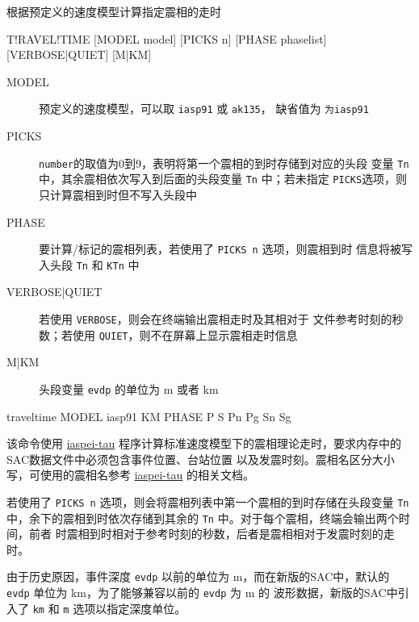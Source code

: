 \label{cmd:traveltime}

根据预定义的速度模型计算指定震相的走时

\begin{SACSTX}
T!RAVEL!TIME [MODEL model] [PICKS n] [PHASE phaselist]
    [VERBOSE|QUIET] [M|KM]
\end{SACSTX}

\begin{description}
\item [MODEL] 预定义的速度模型，可以取 \texttt{iasp91} 或 \texttt{ak135}，
    缺省值为 \texttt{为iasp91}
\item [PICKS] \texttt{number}的取值为0到9，表明将第一个震相的到时存储到对应的头段
    变量 \texttt{Tn} 中，其余震相依次写入到后面的头段变量 \texttt{Tn} 中；若未指定
    \texttt{PICKS}选项，则只计算震相到时但不写入头段中
\item [PHASE] 要计算/标记的震相列表，若使用了 \texttt{PICKS n} 选项，则震相到时
    信息将被写入头段 \texttt{Tn} 和 \texttt{KTn} 中
\item [VERBOSE|QUIET] 若使用 \texttt{VERBOSE}，则会在终端输出震相走时及其相对于
    文件参考时刻的秒数；若使用 \texttt{QUIET}，则不在屏幕上显示震相走时信息
\item [M|KM] 头段变量 \texttt{evdp} 的单位为 \si{\m} 或者 \si{\km}
\end{description}

\begin{SACDFT}
traveltime MODEL iasp91 KM PHASE P S Pn Pg Sn Sg
\end{SACDFT}

该命令使用 \href{https://seiscode.iris.washington.edu/projects/iaspei-tau}{iaspei-tau}
程序计算标准速度模型下的震相理论走时，要求内存中的SAC数据文件中必须包含事件位置、台站位置
以及发震时刻。震相名区分大小写，可使用的震相名参考 
\href{https://seiscode.iris.washington.edu/projects/iaspei-tau}{iaspei-tau} 
的相关文档。

若使用了 \texttt{PICKS n} 选项，则会将震相列表中第一个震相的到时存储在头段变量 \texttt{Tn}
中，余下的震相到时依次存储到其余的 \texttt{Tn} 中。对于每个震相，终端会输出两个时间，前者
时震相到时相对于参考时刻的秒数，后者是震相相对于发震时刻的走时。

由于历史原因，事件深度 \texttt{evdp} 以前的单位为 \si{\m}，而在新版的SAC中，默认的
\texttt{evdp} 单位为 \si{\km}，为了能够兼容以前的 \texttt{evdp} 为 \si{\m} 的
波形数据，新版的SAC中引入了 \texttt{km} 和 \texttt{m} 选项以指定深度单位。

